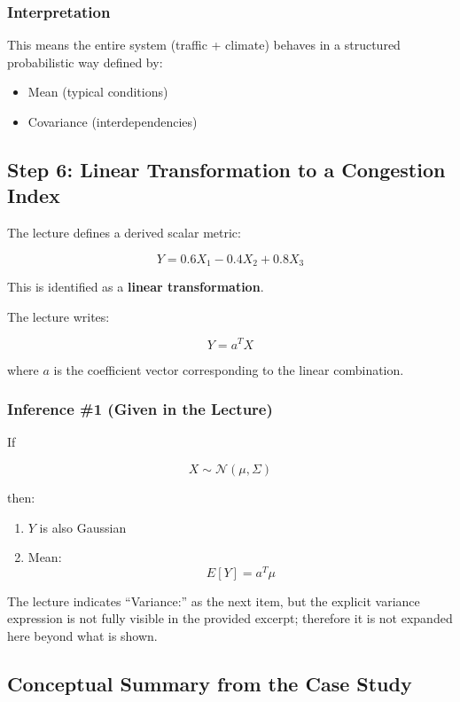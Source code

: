 \documentclass[12pt]{article}
\begin{document}
\subsubsection*{Interpretation}

This means the entire system (traffic + climate) behaves in a structured probabilistic way defined by:

\begin{itemize}
    \item Mean (typical conditions)
    \item Covariance (interdependencies)
\end{itemize}

\subsection{Step 6: Linear Transformation to a Congestion Index}

The lecture defines a derived scalar metric:

\[
Y = 0.6X_1 - 0.4X_2 + 0.8X_3
\]

This is identified as a \textbf{linear transformation}.

The lecture writes:

\[
Y = a^T X
\]

where \(a\) is the coefficient vector corresponding to the linear combination.

\subsubsection*{Inference \#1 (Given in the Lecture)}

If

\[
X \sim \mathcal{N}(\mu,\Sigma)
\]

then:

\begin{enumerate}
    \item \(Y\) is also Gaussian
    \item Mean:
    \[
    E[Y] = a^T \mu
    \]
\end{enumerate}

The lecture indicates ``Variance:'' as the next item, but the explicit variance expression is not fully visible in the provided excerpt; therefore it is not expanded here beyond what is shown.

\subsection{Conceptual Summary from the Case Study}
\end{document}
